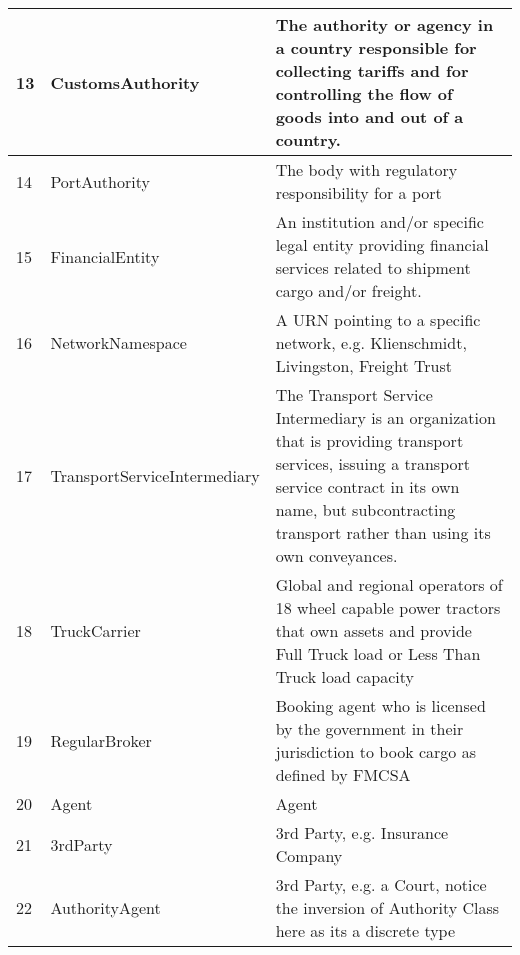 \begin{table}
\begin{tabular}{|l|l|l|}
        13 & CustomsAuthority & The authority or agency in a country responsible for collecting tariffs and for controlling the flow of goods into and out of a country. \\ \hline
        14 & PortAuthority & The body with regulatory responsibility for a port \\ \hline
        15 & FinancialEntity & An institution and/or specific legal entity providing financial services related to shipment cargo and/or freight. \\ \hline
        16 & NetworkNamespace & A URN pointing to a specific network, e.g. Klienschmidt, Livingston, Freight Trust \\ \hline
        17 & TransportServiceIntermediary & The Transport Service Intermediary is an organization that is providing transport services, issuing a transport service contract in its own name, but subcontracting transport rather than using its own conveyances. \\ \hline
        18 & TruckCarrier & Global and regional operators of  18 wheel capable power tractors that own assets and provide Full Truck load or Less Than Truck load capacity \\ \hline
        19 & RegularBroker & Booking agent who is licensed by the government in their jurisdiction to book cargo as defined by FMCSA \\ \hline
        20 & Agent & Agent \\ \hline
        21 & 3rdParty & 3rd Party, e.g. Insurance Company \\ \hline
        22 & AuthorityAgent & 3rd Party, e.g. a Court, notice the inversion of Authority Class here as its a discrete type \\ \hline
    \end{tabular}
\end{table}
